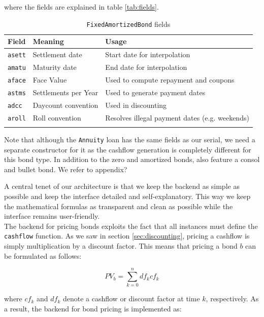 where the fields are explained in table \ref{tab:fields}.

\begin{center}  
\begin{longtable}{l|l|l}
Field & Meaning & Usage\\\hline
\texttt{asett} & Settlement date & Start date for interpolation\\
\texttt{amatu} & Maturity date & End date for interpolation\\
\texttt{aface} & Face Value & Used to compute repayment and coupons\\
\texttt{astms} & Settlements per Year & Used to generate payment dates\\
\texttt{adcc} & Daycount convention & Used in discounting\\
\texttt{aroll} & Roll convention & Resolves illegal payment dates (e.g. weekends)\\
\caption{\texttt{FixedAmortizedBond} fields}
\end{longtable}
\label{tab:fields}
\end{center}

Note that although the \texttt{Annuity} loan has the same fields as our serial,
we need a separate constructor for it as the cashflow generation is completely
different for this bond type\cite{hqldoc}. In addition to the zero and amortized
bonds, \hql also feature a consol and bullet bond. We refer to appendix?

A central tenet of our architecture is that we keep the backend
as simple as possible and keep the interface detailed and 
self-explanatory. This way we keep the mathematical formulas as transparent
and clean as possible while the interface remains user-friendly.\\

The backend for pricing bonds exploits the fact that all instances must define
the \texttt{cashflow} function. As we saw in section \ref{sec:discounting},
pricing a cashflow is simply multiplication by a discount factor. This means
that pricing a bond $b$ can be formulated as follows:

\begin{equation}
PV_b = \sum_{k=0}^n df_k cf_k
\end{equation}

where $cf_k$ and $df_k$ denote a cashflow or discount factor at time $k$,
respectively. As a result, the backend for bond pricing is implemented as:


